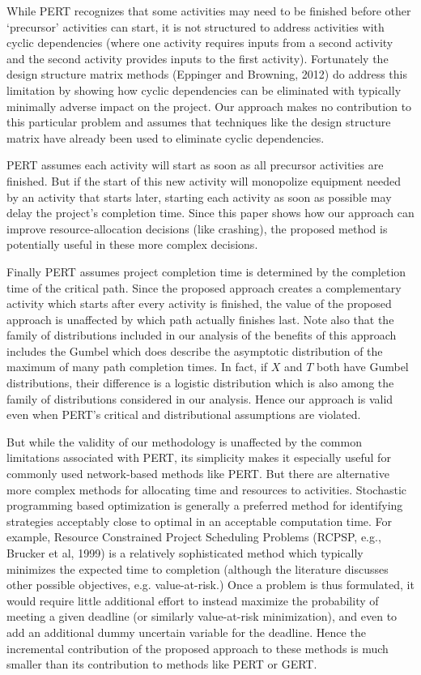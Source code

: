 \documentclass[11pt]{article}
\begin{document}
 While PERT recognizes that some activities may need to be finished before other `precursor' activities can start, it is not structured to address activities with cyclic dependencies (where one activity requires inputs from a second activity and the second activity provides inputs to the first activity).  Fortunately the design structure matrix methods (Eppinger and Browning, 2012) do address this limitation by showing how cyclic dependencies can be eliminated with typically minimally  adverse impact on the project.  Our approach makes no contribution to this particular problem and assumes that techniques like the design structure matrix have already been used to eliminate cyclic dependencies. \par
PERT assumes each activity will start as soon as all precursor activities are finished.  But if the start of this new activity will monopolize equipment needed by an activity that starts later, starting each activity as soon as possible may delay the project's completion time.  Since this paper shows how our approach can improve resource-allocation decisions (like crashing), the proposed method is potentially useful in these more complex decisions.  \par
Finally PERT assumes project completion time is determined by the completion time of the critical path.  Since the proposed approach creates a complementary activity which starts after every activity is finished, the value of the proposed approach is unaffected by which path actually finishes last. Note also that the family of distributions included in our analysis of the benefits of this approach includes the Gumbel which does describe the asymptotic distribution of the maximum of many path completion times. In fact, if $X$ and $T$ both have Gumbel distributions, their difference is a logistic distribution which is also among the family of distributions considered in our analysis.
Hence our approach is valid even when PERT's critical and distributional assumptions are violated.  \par
But while the validity of our methodology is unaffected by the common limitations associated with PERT, its simplicity makes it especially useful for commonly used network-based methods like PERT.   But there are alternative more complex methods for allocating time and resources to activities.
Stochastic programming based optimization is generally a preferred method for identifying strategies acceptably close to optimal in an acceptable computation time. For example, Resource Constrained Project Scheduling Problems (RCPSP, e.g., Brucker et al, 1999) is a relatively sophisticated method which typically minimizes the expected time to completion (although the literature discusses other possible objectives, e.g. value-at-risk.) Once a problem is thus formulated, it would require little additional effort to instead maximize the probability of meeting a given deadline (or similarly value-at-risk minimization), and even to add an additional dummy uncertain variable for the deadline.   Hence the incremental contribution of the proposed approach to these methods is much smaller than its contribution to methods like PERT or GERT.  \par
\end{document}
